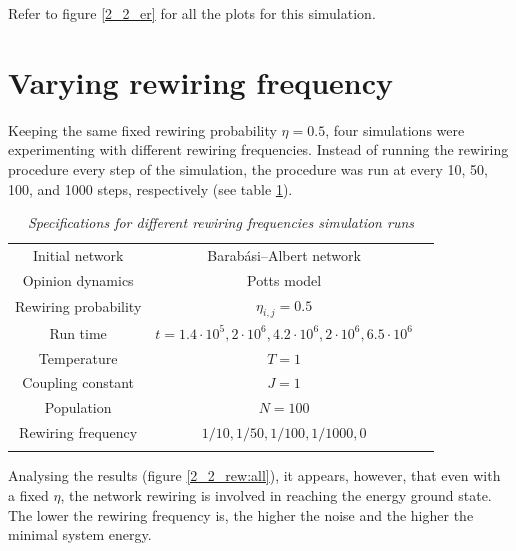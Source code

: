 \documentclass[12pt,openright,twoside]{book}
\begin{document}
Refer to figure \ref{2_2_er} for all the plots for this simulation.

\section{Varying rewiring frequency}

Keeping the same fixed rewiring probability $\eta=0.5$, four simulations were experimenting with different rewiring frequencies. Instead of running the rewiring procedure every step of the simulation, the procedure was run at every 10, 50, 100, and 1000 steps, respectively (see table \ref{rew-specs}).\\

\begin{table}[!ht]
\centering
\begin{small}
\caption{\textit{Specifications for different rewiring frequencies simulation runs}}
\begin{tabular}{ccc}
\hline
Initial network             & Barabási–Albert network\\
Opinion dynamics            & Potts model \\
Rewiring probability        & $\eta_{i,j}=0.5$\\
Run time                    & $t=1.4\cdot 10^5, 2\cdot 10^6, 4.2\cdot 10^6, 2\cdot 10^6, 6.5\cdot 10^6$\\
Temperature                 & $T=1$ \\
Coupling constant           & $J=1$ \\
Population                  & $N=100$\\
Rewiring frequency          & $1/10, 1/50, 1/100, 1/1000, 0$ \\
\hline
\label{rew-specs}
\end{tabular}
\end{small}
\end{table}




Analysing the results (figure \ref{2_2_rew:all}), it appears, however, that even with a fixed $\eta$, the network rewiring is involved in reaching the energy ground state. The lower the rewiring frequency is, the higher the noise and the higher the minimal system energy.\\
\end{document}
